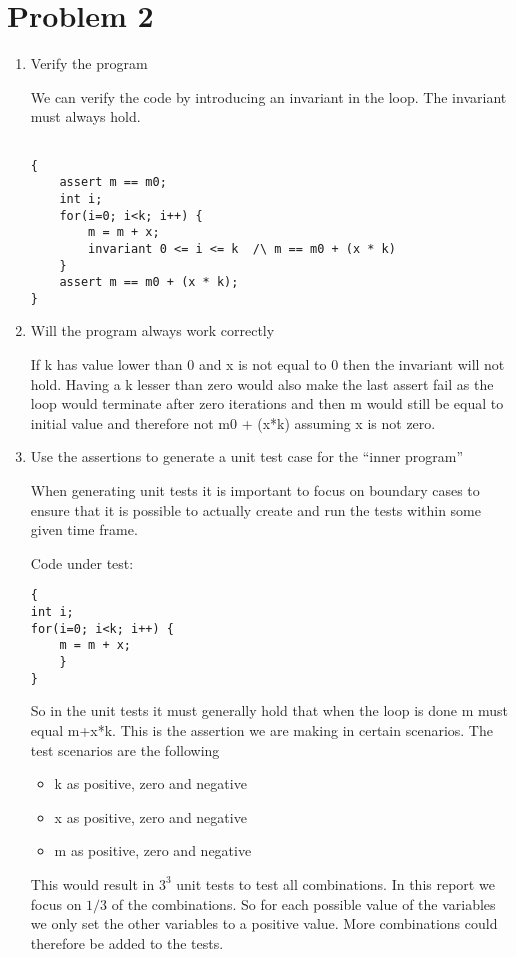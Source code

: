 \chapter{Problem 2}
\label{chp:two}

\begin{enumerate}[label=(\alph*)]

\item  Verify the program

We can verify the code by introducing an invariant in the loop. The invariant must always hold.


\begin{lstlisting}

{
	assert m == m0;
	int i;
	for(i=0; i<k; i++) {
		m = m + x;
		invariant 0 <= i <= k  /\ m == m0 + (x * k)
	}
	assert m == m0 + (x * k);
}
\end{lstlisting}


\item Will the program always work correctly

If k has value lower than 0 and x is not equal to 0 then the invariant will not hold. Having a k lesser than zero would also make the last assert fail as the loop would terminate after zero iterations and then m would still be equal to initial value and therefore not m0 + (x*k) assuming x is not zero.


\item  Use the assertions to generate a unit test case for the “inner program”

When generating unit tests it is important to focus on boundary cases to ensure that it is possible to actually create and run the tests within some given time frame.

Code under test:
\begin{lstlisting}
{
int i;
for(i=0; i<k; i++) {
	m = m + x;
	}
}
\end{lstlisting}

So in the unit tests it must generally hold that when the loop is done m must equal m+x*k. This is the assertion we are making in certain scenarios. The test scenarios are the following
\begin{itemize}
	\item k as positive, zero and negative
	\item x as positive, zero and negative
	\item m as positive, zero and negative
\end{itemize}

This would result in $3^3$ unit tests to test all combinations. In this report we focus on $1/3$ of the combinations. So for each possible value of the variables we only set the other variables to a positive value. More combinations could therefore be added to the tests.


\end{enumerate}
